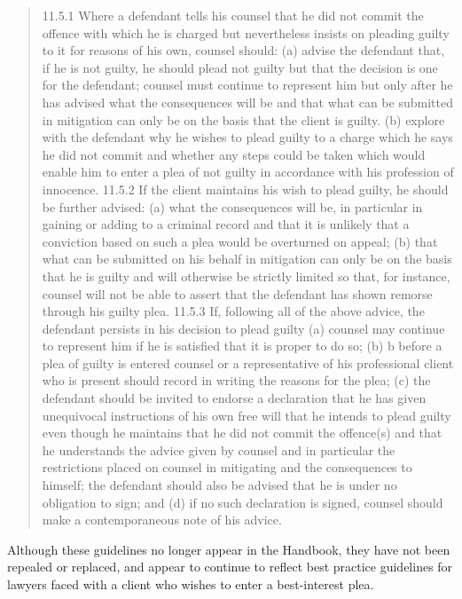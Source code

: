 \begin{quote}
    11.5.1 Where a defendant tells his counsel that he did not commit the offence with which he is charged but nevertheless insists on pleading guilty to it for reasons of his own, counsel should:
(a) advise the defendant that, if he is not guilty, he should plead not guilty but that the decision is one for the defendant; counsel must continue to represent him but only after he has advised what the consequences will be and that what can be submitted in mitigation can only be on the basis that the client is guilty.
(b) explore with the defendant why he wishes to plead guilty to a charge which he says he did not commit and whether any steps could be taken which would enable him to enter a plea of not guilty in accordance with his profession of innocence.
11.5.2 If the client maintains his wish to plead guilty, he should be further advised:
(a) what the consequences will be, in particular in gaining or adding to a criminal record and that it is unlikely that a conviction based on such a plea would be overturned on appeal;
(b) that what can be submitted on his behalf in mitigation can only be on the basis that he is guilty and will otherwise be strictly limited so that, for instance, counsel will not be able to assert that the defendant has shown remorse through his guilty plea.
11.5.3 If, following all of the above advice, the defendant persists in his decision to plead guilty
(a) counsel may continue to represent him if he is satisfied that it is proper to do so;
(b) b before a plea of guilty is entered counsel or a representative of his professional client who is present should record in writing the reasons for the plea;
(c) the defendant should be invited to endorse a declaration that he has given unequivocal instructions of his own free will that he intends to plead guilty even though he maintains that he did not commit the offence(s) and that he understands the advice given by counsel and in particular the restrictions placed on counsel in mitigating and the consequences to himself; the defendant should also be advised that he is under no obligation to sign; and
(d) if no such declaration is signed, counsel should make a contemporaneous note of his advice.
\end{quote}

Although these guidelines no longer appear in the Handbook, they have not been repealed or replaced, and appear to continue to reflect best practice guidelines for lawyers faced with a client who wishes to enter a best-interest plea.


